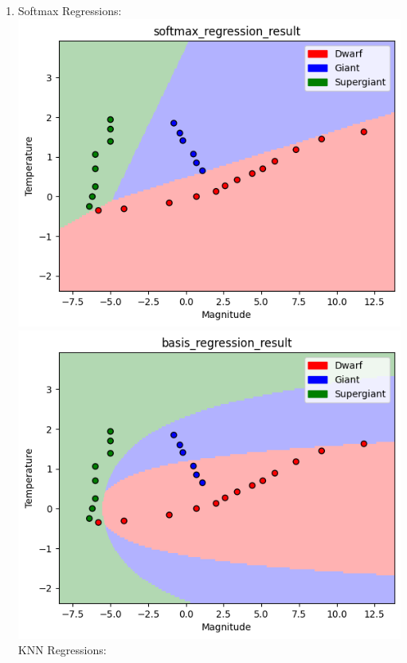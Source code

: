 \documentclass[submit]{harvardml}
\begin{document}
\begin{enumerate}
    \item Softmax Regressions:\\
     \includegraphics[scale=0.4]{hw2/images/softmax_regression.png}
     \includegraphics[scale=0.4]{hw2/images/basis_regression.png}\\
     KNN Regressions:\\

\end{enumerate}
\end{document}
